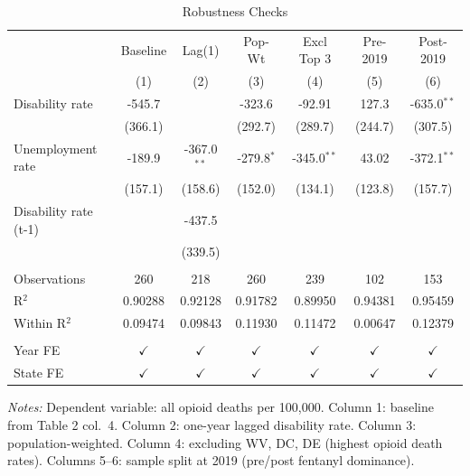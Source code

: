 
\begin{table}[htbp]
   \caption{\label{tab:robust} Robustness Checks}
   \bigskip
   \centering
   \begin{tabular}{lcccccc}
      \toprule
                            & Baseline      & Lag(1)        & Pop-Wt        & Excl Top 3    & Pre-2019      & Post-2019 \\   
                            & (1)           & (2)           & (3)           & (4)           & (5)           & (6)\\  
      \midrule 
      Disability rate       & -545.7        &               & -323.6        & -92.91        & 127.3         & -635.0$^{**}$\\   
                            & (366.1)       &               & (292.7)       & (289.7)       & (244.7)       & (307.5)\\   
      Unemployment rate     & -189.9        & -367.0$^{**}$ & -279.8$^{*}$  & -345.0$^{**}$ & 43.02         & -372.1$^{**}$\\   
                            & (157.1)       & (158.6)       & (152.0)       & (134.1)       & (123.8)       & (157.7)\\   
      Disability rate (t-1) &               & -437.5        &               &               &               &   \\   
                            &               & (339.5)       &               &               &               &   \\   
       \\
      Observations          & 260           & 218           & 260           & 239           & 102           & 153\\  
      R$^2$                 & 0.90288       & 0.92128       & 0.91782       & 0.89950       & 0.94381       & 0.95459\\  
      Within R$^2$          & 0.09474       & 0.09843       & 0.11930       & 0.11472       & 0.00647       & 0.12379\\  
       \\
      Year FE               & $\checkmark$  & $\checkmark$  & $\checkmark$  & $\checkmark$  & $\checkmark$  & $\checkmark$\\   
      State FE              & $\checkmark$  & $\checkmark$  & $\checkmark$  & $\checkmark$  & $\checkmark$  & $\checkmark$\\   
      \bottomrule
   \end{tabular}
   
   \par \raggedright 
   \textit{Notes:} Dependent variable: all opioid deaths per 100,000. Column 1: baseline from Table 2 col.~4. Column 2: one-year lagged disability rate. Column 3: population-weighted. Column 4: excluding WV, DC, DE (highest opioid death rates). Columns 5--6: sample split at 2019 (pre/post fentanyl dominance).
\end{table}


